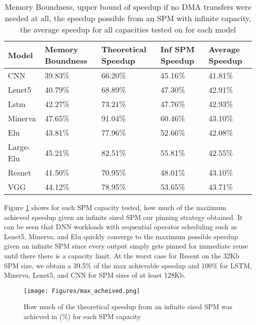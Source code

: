 \begin{table}[]
	\begin{tabular}{|l|l|l|l|l|}
		\hline
		Model     & Memory Boundness & Theoretical Speedup & Inf SPM Speedup & Average Speedup\\ \hline
		CNN       & 39.83\%          & 66.20\%             & 45.16\%              & 41.81\%        \\ \hline
		Lenet5    & 40.79\%          & 68.89\%             & 47.30\%              & 42.91\%        \\ \hline
		Lstm      & 42.27\%          & 73.21\%             & 47.76\%              & 42.93\%        \\ \hline
		Minerva   & 47.65\%          & 91.04\%             & 60.46\%              & 43.10\%        \\ \hline
		Elu       & 43.81\%          & 77.96\%             & 52.66\%              & 42.08\%        \\ \hline
		Large-Elu & 45.21\%          & 82.51\%             & 55.81\%              & 42.55\%        \\ \hline
		Resnet    & 41.50\%          & 70.95\%             & 48.01\%              & 43.10\%        \\ \hline
		VGG       & 44.12\%          & 78.95\%             & 53.65\%              & 43.71\%        \\ \hline
	\end{tabular}
	\caption[Comparison of Speedup Acheived and Upper Bound Speedup]{Memory Boundness, upper bound of speedup if no DMA transfers were needed at all, the speedup possible from an SPM with infinite capacity, the average
	speedup for all capacities tested on for each model}
	\label{tab:memory_bound}
\end{table}

Figure \ref{fig:max} shows for each SPM capacity tested, how much of the
maximum achieved speedup given an infinite sized SPM our pinning strategy
obtained. It can be seen that DNN workloads with sequential operator scheduling
such as Lenet5, Minerva, and Elu quickly converge to the maximum possible
speedup given an infinite SPM since every output simply gets pinned for
immediate reuse until there there is a capacity limit. At the worst case for Resent
on the 32Kb SPM size, we obtain a 39.5\% of the max achievable speedup and 100\% for
LSTM, Minerva, Lenet5, and CNN for SPM sizes of at least 128Kb.

\begin{figure}[!htb]
\centering
\texttt{[image: Figures/max\_acheived.png]}
\decoRule
\caption[Percentage of Max Speedup Obtained]{How much of the theoretical speedup from an infinite sized SPM was achieved in (\%) for each SPM capacity}
\label{fig:max}
\end{figure}

